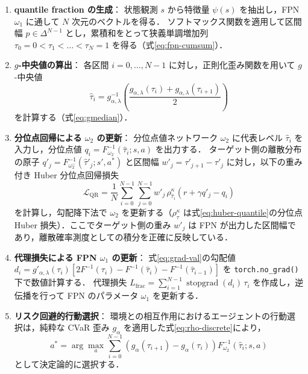 \documentclass[a4paper,10pt]{jsarticle}
\theoremstyle{definition}
\renewcommand{\Finv}{F^{-1}}
\begin{document}
\begin{enumerate}
  \item \textbf{quantile fraction の生成}：
  状態観測 $s$ から特徴量 $\psi(s)$ を抽出し，FPN $\omega_1$ に通して $N$ 次元のベクトルを得る．
  ソフトマックス関数を適用して区間幅 $p \in \Delta^{N-1}$ とし，累積和をとって狭義単調増加列 $\tau_0=0 < \tau_1 < \dots < \tau_N=1$ を得る（式\eqref{eq:fpn-cumsum}）．
  \item \textbf{$g$-中央値の算出}：
  各区間 $i=0,\dots,N-1$ に対し，正則化歪み関数を用いて $g$-中央値
  \begin{equation}
    \hat\tau_i = g_{\alpha,\lambda}^{-1}\!\left(\frac{g_{\alpha,\lambda}(\tau_i) + g_{\alpha,\lambda}(\tau_{i+1})}{2}\right)
  \end{equation}
  を計算する（式\eqref{eq:gmedian}）．
  \item \textbf{分位点回帰による $\omega_2$ の更新}：
  分位点値ネットワーク $\omega_2$ に代表レベル $\hat\tau_i$ を入力し，分位点値 $q_i = \Finv_{\omega_2}(\hat\tau_i; s, a)$ を出力する．
  ターゲット側の離散分布の原子 $q'_j = \Finv_{\omega_2^-}(\hat\tau'_j; s', a^*)$ と区間幅 $w'_j = \tau'_{j+1} - \tau'_j$ に対し，以下の重み付き Huber 分位点回帰損失
  \begin{equation}
    \mathcal{L}_{\mathrm{QR}} = \frac{1}{N} \sum_{i=0}^{N-1} \sum_{j=0}^{N-1} w'_j\,\rho^\kappa_{\hat\tau_i}\!\left(r + \gamma q'_j - q_i\right)
    \label{eq:b-loss}
  \end{equation}
  を計算し，勾配降下法で $\omega_2$ を更新する（$\rho^\kappa_\tau$ は式\eqref{eq:huber-quantile}の分位点 Huber 損失）．ここでターゲット側の重み $w'_j$ は FPN が出力した区間幅であり，離散確率測度としての積分を正確に反映している．
  \item \textbf{代理損失による FPN $\omega_1$ の更新}：
  式\eqref{eq:grad-val}の勾配値 $d_i = g'_{\alpha,\lambda}(\tau_i)[2\Finv(\tau_i) - \Finv(\hat\tau_i) - \Finv(\hat\tau_{i-1})]$ を \texttt{torch.no\_grad()} 下で数値計算する．
  代理損失 $L_{\mathrm{frac}} = \sum_{i=1}^{N-1} \operatorname{stopgrad}(d_i)\,\tau_i$ を作成し，逆伝播を行って FPN のパラメータ $\omega_1$ を更新する．
  \item \textbf{リスク回避的行動選択}：
  環境との相互作用におけるエージェントの行動選択は，純粋な CVaR 歪み $g_\alpha$ を適用した式\eqref{eq:rho-discrete}により，
  \begin{equation}
    a^* = \arg\max_a \sum_{i=0}^{N-1}\left(g_\alpha(\tau_{i+1}) - g_\alpha(\tau_i)\right)\Finv_{\omega_2}(\hat\tau_i; s, a)
  \end{equation}
  として決定論的に選択する．
\end{enumerate}
\end{document}
